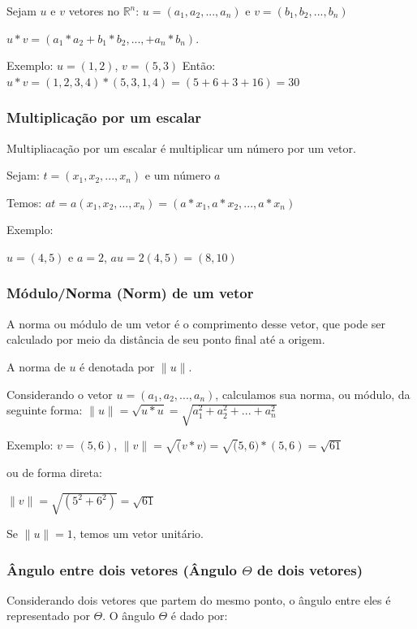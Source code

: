 \documentclass[12pt]{article}
\begin{document}
Sejam \(u\) e \(v\) vetores no \(\mathbb{R}^n\): \(u=(a_{1}, a_{2},...,a_{n})\) e \(v=(b_{1}, b_{2},...,b_{n})\)

\(u*v = (a_{1} * a_{2} + b_{1} * b_{2} ,..., + a_{n} * b_{n})\).

Exemplo: \(u = (1,2)\), \(v = (5, 3)\)
Então: \(u*v = (1, 2, 3, 4) * (5, 3, 1, 4) = (5 + 6 + 3 + 16) = 30\)

\subsubsection{Multiplicação por um escalar}

Multipliacação por um escalar é multiplicar um número por um vetor.

Sejam: \(t = (x_{1}, x_{2}, ..., x_{n})\) e um número \(a\)

Temos: \(at = a(x_{1}, x_{2}, ..., x_{n}) = (a*x_{1}, a*x_{2}, ..., a*x_{n})\)

Exemplo:

\(u = (4, 5)\) e \(a = 2\), \(au = 2(4, 5) = (8, 10)\)

\subsubsection{Módulo/Norma (Norm) de um vetor}

A norma ou módulo de um vetor é o comprimento desse vetor, que pode ser calculado por meio da distância de seu ponto final até a origem.

A norma de \( u \) é denotada por \( \| u \| \).

Considerando o vetor \(u = (a_{1}, a_{2}, ..., a_{n})\), calculamos sua norma, ou módulo, da seguinte forma\cite{lipschutz-algebra, anton2012algebra}: \( \|u\| = \sqrt{u*u} = \sqrt{a_{1}^2 + a_{2}^2 + ... + a_{n}^2} \) 

Exemplo: \(v = (5, 6)\), \(\|v\| = \sqrt(v*v) = \sqrt(5,6)*(5,6) = \sqrt{61}\)

ou de forma direta:

\(\|v\| = \sqrt{(5^2+6^2)} = \sqrt{61}\)


Se \(\|u\| = 1\), temos um vetor unitário.

\subsubsection{Ângulo entre dois vetores (Ângulo $\Theta$ de dois vetores)}

Considerando dois vetores que partem do mesmo ponto, o ângulo entre eles é representado por $\Theta$. O ângulo $\Theta$ é dado por:
\end{document}
